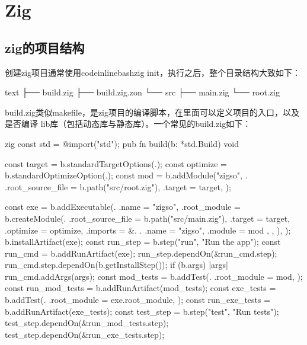 \chapter{Zig}

\section{zig的项目结构}
创建zig项目通常使用{codeinline}{bash}{zig init}，执行之后，整个目录结构大致如下：
\begin{code-block}{text}
├── build.zig
├── build.zig.zon
└── src
    ├── main.zig
    └── root.zig
\end{code-block}
build.zig类似makefile，是zig项目的编译脚本，在里面可以定义项目的入口，以及是否编译
lib库（包括动态库与静态库）。一个常见的build.zig如下：
\begin{code-block}{zig}
const std = @import("std");
pub fn build(b: *std.Build) void {
    const target = b.standardTargetOptions(.{});
    const optimize = b.standardOptimizeOption(.{});
    const mod = b.addModule("zigso", .{
        .root_source_file = b.path("src/root.zig"),
        .target = target,
    });

    const exe = b.addExecutable(.{
        .name = "zigso",
        .root_module = b.createModule(.{
            .root_source_file = b.path("src/main.zig"),
            .target = target,
            .optimize = optimize,
            .imports = &.{
                .{ .name = "zigso", .module = mod },
            },
        }),
    });
    b.installArtifact(exe);
    const run_step = b.step("run", "Run the app");
    const run_cmd = b.addRunArtifact(exe);
    run_step.dependOn(&run_cmd.step);
    run_cmd.step.dependOn(b.getInstallStep());
    if (b.args) |args| {
        run_cmd.addArgs(args);
    }
    const mod_tests = b.addTest(.{
        .root_module = mod,
    });
    const run_mod_tests = b.addRunArtifact(mod_tests);
    const exe_tests = b.addTest(.{
        .root_module = exe.root_module,
    });
    const run_exe_tests = b.addRunArtifact(exe_tests);
    const test_step = b.step("test", "Run tests");
    test_step.dependOn(&run_mod_tests.step);
    test_step.dependOn(&run_exe_tests.step);
}
\end{code-block}

